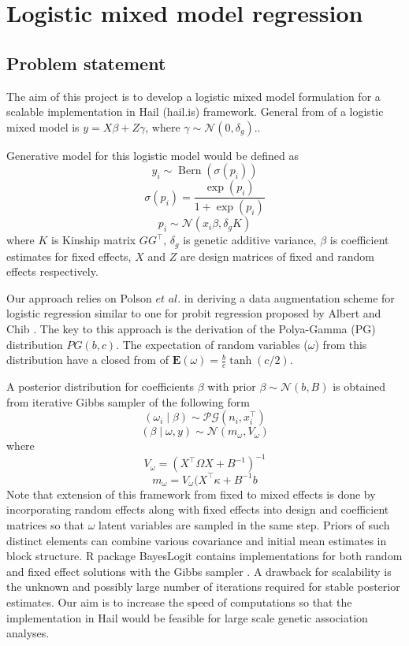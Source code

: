 \documentclass [12pt,a4paper]{report}
\begin{document}
\section*{Logistic mixed model regression}
\subsection*{Problem statement}
The aim of this project is to develop a logistic mixed model formulation for a scalable implementation in Hail (hail.is) framework.
General from of a logistic mixed model is   \( y=X\beta + Z\gamma \), where \(\gamma \sim \mathcal{N}(0,\delta_g).\).\par 
Generative model for this logistic model would be defined as \[ y_i \sim \operatorname{Bern} (\sigma(p_i)) \]  \[\sigma(p_i)=\frac{\exp(p_i)}{1+\exp(p_i)} \] \[p_i \sim \mathcal{N}(x_i\beta, \delta_g K) \]  where $K$ is Kinship matrix $GG^{\intercal}$, $\delta_g$ is genetic additive variance, $\beta$ is coefficient estimates for fixed effects, $X$ and $Z$ are design matrices of fixed and random effects respectively.\par
Our approach relies on Polson $\textit{et al.}$ \cite{polson_bayesian_2012} in deriving a data augmentation scheme for logistic regression similar to one for probit regression proposed by Albert and Chib \cite{albert_bayesian_1993}. The key to this approach is the derivation of the Polya-Gamma (PG) distribution $PG(b,c)$. The expectation of random variables ($\omega$) from this distribution have a closed from of \(\mathbf{E}(\omega)=\frac{b}{c}\tanh(c/2)\). \par 
A posterior distribution for coefficients $\beta$ with prior   \(\beta \sim \mathcal{N}(b,B) \) is obtained from iterative Gibbs sampler of the following form \[(\omega_i \mid \beta ) \sim  \mathcal{PG}(n_i,x^{\intercal}_i)  \]    \[(\beta \mid \omega,y ) \sim  \mathcal{N}(m_\omega,V_\omega)  \] where    \[ V_\omega = (X^{\intercal} \Omega X + B^{-1})^{-1}  \]   \[ m_\omega = V_\omega(X^{\intercal}\kappa +  B^{-1}b \] 
Note that extension of this framework from fixed to mixed effects  is done by incorporating random effects along with fixed effects into design and coefficient matrices so that $\omega$ latent variables are sampled in the same step. Priors of such distinct elements can combine various covariance and initial mean estimates in block structure. R package  BayesLogit contains implementations for both random and fixed effect solutions with the Gibbs sampler \cite{polson_bayesian_2012}. A drawback for scalability is the unknown and possibly large number of iterations required for stable posterior estimates. Our aim is to increase the speed of computations so that the implementation in Hail would be feasible for large scale genetic association analyses. 
\end{document}
